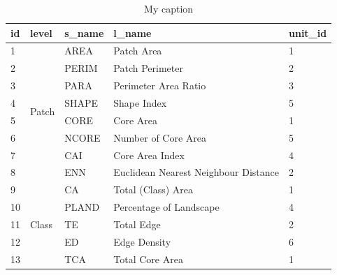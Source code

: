 \begin{table}[]
\centering
\caption{My caption}
\label{my-label}
\begin{tabular}{@{}lllll@{}}
\toprule
\textbf{id} & \textbf{level}              & \textbf{s\_name} & \textbf{l\_name}                     & \textbf{unit\_id} \\ \midrule
1           & \multirow{8}{*}{Patch}      & AREA             & Patch Area                           & 1                 \\
2           &                             & PERIM            & Patch Perimeter                      & 2                 \\
3           &                             & PARA             & Perimeter Area Ratio                 & 3                 \\
4           &                             & SHAPE            & Shape Index                          & 5                 \\
5           &                             & CORE             & Core Area                            & 1                 \\
6           &                             & NCORE            & Number of Core Area                  & 5                 \\
7           &                             & CAI              & Core Area Index                      & 4                 \\
8           &                             & ENN              & Euclidean Nearest Neighbour Distance & 2                 \\ \midrule
9           & \multirow{8}{*}{Class}      & CA               & Total (Class) Area                   & 1                 \\
10          &                             & PLAND            & Percentage of Landscape              & 4                 \\
11          &                             & TE               & Total Edge                           & 2                 \\
12          &                             & ED               & Edge Density                         & 6                 \\
13          &                             & TCA              & Total Core Area                      & 1                 \\

\end{tabular}
\end{table}
